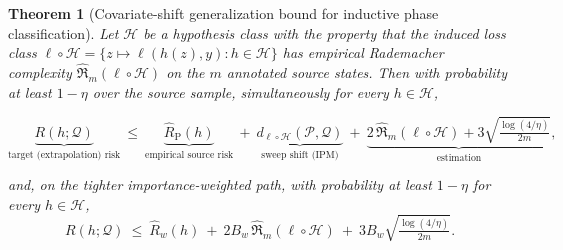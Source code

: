 \documentclass[aps,prresearch,reprint,amsmath,amssymb,nofootinbib,superscriptaddress,floatfix]{revtex4-2}
\newtheorem{theorem}{Theorem}
\theoremstyle{definition}
\theoremstyle{remark}
\theoremstyle{plain}
\begin{document}
\begin{theorem}[Covariate-shift generalization bound for inductive phase classification]
\label{thm:covshift}
Let $\mathcal H$ be a hypothesis class with the property that the induced loss class $\ell\circ\mathcal
H=\{z\mapsto\ell(h(z),y):h\in\mathcal H\}$ has empirical Rademacher complexity
$\widehat{\mathfrak R}_m(\ell\circ\mathcal H)$ on the $m$ annotated source states. Then with probability at
least $1-\eta$ over the source sample, simultaneously for every $h\in\mathcal H$,
\begin{widetext}
\begin{equation}
\underbrace{R(h;\mathcal Q)}_{\text{target (extrapolation) risk}}\ \le\
\underbrace{\widehat R_{\mathrm P}(h)}_{\text{empirical source risk}}
\ +\ \underbrace{d_{\ell\circ\mathcal H}(\mathcal P,\mathcal Q)}_{\text{sweep shift (IPM)}}
\ +\ \underbrace{2\,\widehat{\mathfrak R}_m(\ell\circ\mathcal H)+3\sqrt{\tfrac{\log(4/\eta)}{2m}}}_{\text{estimation}} ,
\label{eq:covshift-ipm}
\end{equation}
\end{widetext}
and, on the tighter importance-weighted path, with probability at least $1-\eta$ for every $h\in\mathcal H$,
\begin{equation}
R(h;\mathcal Q)\ \le\ \widehat R_{w}(h)\ +\ 2B_w\,\widehat{\mathfrak R}_m(\ell\circ\mathcal H)
\ +\ 3B_w\sqrt{\tfrac{\log(4/\eta)}{2m}} .
\label{eq:covshift-iw}
\end{equation}
\end{theorem}
\end{document}
